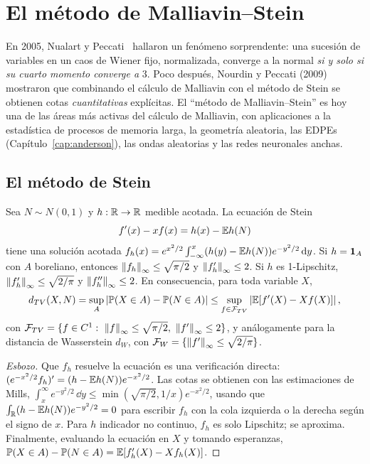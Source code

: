 \chapter{El método de Malliavin--Stein}\label{cap:malliavin-stein}

\begin{panorama}
En 2005, Nualart y Peccati~\cite{NualartPeccati05} hallaron un fenómeno sorprendente: una sucesión de
variables en un caos de Wiener fijo, normalizada, converge a la normal \emph{si y solo si su
cuarto momento converge a} 3. Poco después, Nourdin y Peccati (2009) mostraron que
combinando el cálculo de Malliavin con el método de Stein se obtienen cotas \emph{cuantitativas}
explícitas. El ``método de Malliavin--Stein'' es hoy una de las áreas más activas del cálculo
de Malliavin, con aplicaciones a la estadística de procesos de memoria larga, la geometría
aleatoria, las EDPEs (Capítulo~\ref{cap:anderson}), las ondas aleatorias y las redes neuronales anchas.
\end{panorama}

\section{El método de Stein}

\begin{lema}[Stein]\label{lem:stein-ecuacion}
Sea $N\sim N(0,1)$ y $h:\mathbb{R}\to\mathbb{R}$ medible acotada. La ecuación de Stein
\[
  f'(x)-xf(x)=h(x)-\mathbb{E} h(N)
\]
tiene una solución acotada $f_h(x)=e^{x^2/2}\int_{-\infty}^x(h(y)-\mathbb{E} h(N))e^{-y^2/2}\,\mathrm{d} y$. Si $h=\mathbf{1}_A$ con $A$
boreliano, entonces $\left\lVert f_h\right\rVert_\infty\le\sqrt{\pi/2}$ y $\left\lVert f_h'\right\rVert_\infty\le2$. Si $h$ es 1-Lipschitz, $\left\lVert f_h'\right\rVert_\infty\le\sqrt{2/\pi}$ y
$\left\lVert f_h''\right\rVert_\infty\le2$. En consecuencia, para toda variable $X$,
\[
  d_{TV}(X,N)=\sup_A\left\lvert \mathbb{P}(X\in A)-\mathbb{P}(N\in A)\right\rvert\le\sup_{f\in\mathcal{F}_{TV}}\left\lvert \mathbb{E}[f'(X)-Xf(X)]\right\rvert,
\]
con $\mathcal{F}_{TV}=\{f\in C^1:\ \left\lVert f\right\rVert_\infty\le\sqrt{\pi/2},\ \left\lVert f'\right\rVert_\infty\le2\}$, y análogamente para la distancia de
Wasserstein $d_W$, con $\mathcal{F}_W=\{\left\lVert f'\right\rVert_\infty\le\sqrt{2/\pi}\}$.
\end{lema}

\begin{proof}[Esbozo]
Que $f_h$ resuelve la ecuación es una verificación directa: $(e^{-x^2/2}f_h)'=(h-\mathbb{E} h(N))e^{-x^2/2}$.
Las cotas se obtienen con las estimaciones de Mills, $\int_x^\infty e^{-y^2/2}\,\dd y\le\min(\sqrt{\pi/2},1/x)e^{-x^2/2}$,
usando que $\int_{\mathbb{R}}(h-\mathbb{E} h(N))e^{-y^2/2}=0$ para escribir $f_h$ con la cola izquierda o la derecha según
el signo de $x$. Para $h$ indicador no continuo, $f_h$ es solo Lipschitz; se aproxima. Finalmente,
evaluando la ecuación en $X$ y tomando esperanzas, $\mathbb{P}(X\in A)-\mathbb{P}(N\in A)=\mathbb{E}[f_h'(X)-
Xf_h(X)]$.
\end{proof}

